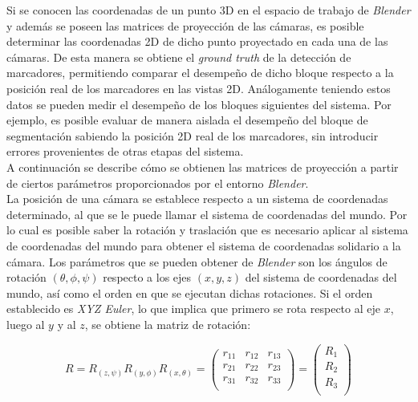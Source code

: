 Si se conocen las coordenadas de un punto 3D en el espacio de trabajo de \emph{Blender} y además se poseen las matrices de proyección de las cámaras, es posible determinar las coordenadas 2D de dicho punto proyectado en cada una de las cámaras. De esta manera se obtiene  el \textit{ground truth} de la detección de marcadores, permitiendo comparar el desempeño de dicho bloque respecto  a la posición real de los marcadores en las vistas 2D. Análogamente teniendo estos datos se pueden medir el desempeño de los bloques siguientes del sistema. Por ejemplo, es posible evaluar de manera aislada el desempeño del bloque de segmentación sabiendo la posición 2D real de los marcadores, sin introducir errores provenientes de otras etapas del sistema.\\

A continuación se describe cómo se obtienen las matrices de proyección a partir de ciertos parámetros proporcionados por el entorno \emph{Blender}.\\

La posición de una cámara se establece respecto a un sistema de coordenadas determinado, al que se le puede llamar el sistema de coordenadas del mundo. Por lo cual es posible saber la rotación y traslación que es necesario aplicar al sistema de coordenadas del mundo para obtener el sistema de coordenadas solidario a la cámara. Los parámetros que se pueden obtener de \emph{Blender} son los ángulos de rotación $(\theta, \phi, \psi )$ respecto a los ejes $(x,y, z)$ del sistema de coordenadas del mundo, así como el orden en que se ejecutan dichas rotaciones. Si el orden establecido es \textit{XYZ Euler}, lo que implica que primero se rota respecto al eje $x$, luego al $y$ y al $z$, se obtiene la matriz de rotación:

\[R=R_{(z,\psi)}R_{(y,\phi)}R_{(x,\theta)}
= \begin{pmatrix}
		r_{11} & r_{12} & r_{13}\\
		r_{21} & r_{22} & r_{23}\\
		r_{31} & r_{32} & r_{33}\\ 
\end{pmatrix}= 
\begin{pmatrix}
			R_1 \\
			R_2 \\
			R_3 \\
		\end{pmatrix}
\]
 

